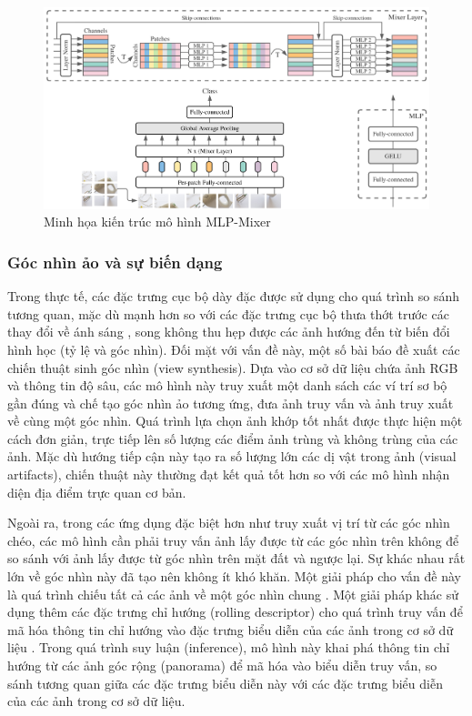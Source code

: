 \begin{figure}[h]
    \centering
    \includegraphics[width=\textwidth]{pics/Chapter2/mlpmixer.png}
    \caption{Minh họa kiến trúc mô hình MLP-Mixer \cite{tolstikhin2021mlpmixer}}
    \label{fig:mlpmixer}
\end{figure}

\subsubsection{Góc nhìn ảo và sự biến dạng}

Trong thực tế, các đặc trưng cục bộ dày đặc được sử dụng cho quá trình so sánh tương quan, mặc dù mạnh hơn so với các đặc trưng cục bộ thưa thớt trước các thay đổi về ánh sáng \cite{zhou2016evaluating}, song không thu hẹp được các ảnh hướng đến từ biến đổi hình học (tỷ lệ và góc nhìn). Đối mặt với vấn đề này, một số bài báo \cite{Torii-CVPR2015, taira2018inloc} đề xuất các chiến thuật sinh góc nhìn (view synthesis). Dựa vào cơ sở dữ liệu chứa ảnh RGB và thông tin độ sâu, các mô hình này truy xuất một danh sách các ví trí sơ bộ gần đúng và chế tạo góc nhìn ảo tương ứng, đưa ảnh truy vấn và ảnh truy xuất về cùng một góc nhìn. Quá trình lựa chọn ảnh khớp tốt nhất được thực hiện một cách đơn giản, trực tiếp lên số lượng các điểm ảnh trùng và không trùng của các ảnh. Mặc dù hướng tiếp cận này tạo ra số lượng lớn các dị vật trong ảnh (visual artifacts), chiến thuật này thường đạt kết quả tốt hơn so với các mô hình nhận diện địa điểm trực quan cơ bản.

Ngoài ra, trong các ứng dụng đặc biệt hơn như truy xuất vị trí từ các góc nhìn chéo, các mô hình cần phải truy vấn ảnh lấy được từ các góc nhìn trên không để so sánh với ảnh lấy được từ góc nhìn trên mặt đất và ngược lại. Sự khác nhau rất lớn về góc nhìn này đã tạo nên không ít khó khăn. Một giải pháp cho vấn đề này là quá trình chiếu tất cả các ảnh về một góc nhìn chung \cite{lin2015learning, castaldo2015semantic}. Một giải pháp khác sử dụng thêm các đặc trưng chỉ hướng (rolling descriptor) cho quá trình truy vấn để mã hóa thông tin chỉ hướng vào đặc trưng biểu diễn của các ảnh trong cơ sở dữ liệu \cite{xia2023convolutional}. Trong quá trình suy luận (inference), mô hình này khai phá thông tin chỉ hướng từ các ảnh góc rộng (panorama) để mã hóa vào biểu diễn truy vấn, so sánh tương quan giữa các đặc trưng biểu diễn này với các đặc trưng biểu diễn của các ảnh trong cơ sở dữ liệu.

